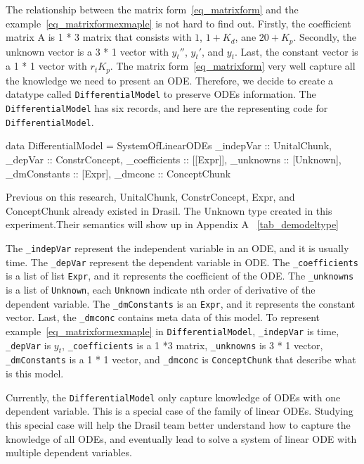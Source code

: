 The relationship between the matrix form~\ref{eq_matrixform} and the example~\ref{eq_matrixformexmaple} is not hard to find out. Firstly, the coefficient matrix A is 1 * 3 matrix that consists with $1$, $1 + K_d$, ane $20 + K_p$. Secondly, the unknown vector is a 3 * 1 vector with $y_t''$, $y_t'$, and $y_t$. Last, the constant vector is a 1 * 1 vector with $r_t K_p$. The matrix form~\ref{eq_matrixform} very well capture all the knowledge we need to present an ODE. Therefore, we decide to create a datatype called \verb|DifferentialModel| to preserve ODEs information. The \verb|DifferentialModel| has six records, and here are the representing code for \verb|DifferentialModel|.
\begin{haskell1}
data DifferentialModel = SystemOfLinearODEs {
	_indepVar :: UnitalChunk,
	_depVar :: ConstrConcept,
	_coefficients :: [[Expr]],
	_unknowns :: [Unknown],
	_dmConstants :: [Expr],
	_dmconc :: ConceptChunk
}
\end{haskell1}

Previous on this research, UnitalChunk, ConstrConcept, Expr, and ConceptChunk already existed in Drasil. The Unknown type created in this experiment.Their semantics will show up in Appendix A ~\ref{tab_demodeltype}

The \verb|_indepVar| represent the independent variable in an ODE, and it is usually time. The \verb|_depVar| represent the dependent variable in ODE. The \verb|_coefficients| is a list of list \verb|Expr|, and it represents the coefficient of the ODE. The \verb|_unknowns| is a list of \verb|Unknown|, each \verb|Unknown| indicate nth order of derivative of the dependent variable. The \verb|_dmConstants| is an \verb|Expr|, and it represents the constant vector. Last, the \verb|_dmconc| contains meta data of this model. To represent example~\ref{eq_matrixformexmaple} in \verb|DifferentialModel|, \verb|_indepVar| is time, \verb|_depVar| is $y_t$, \verb|_coefficients| is a 1 *3 matrix, \verb|_unknowns| is 3 * 1 vector, \verb|_dmConstants| is a 1 * 1 vector, and \verb|_dmconc| is \verb|ConceptChunk| that describe what is this model.

Currently, the \verb|DifferentialModel| only capture knowledge of ODEs with one dependent variable. This is a special case of the family of linear ODEs. Studying this special case will help the Drasil team better understand how to capture the knowledge of all ODEs, and eventually lead to solve a system of linear ODE with multiple dependent variables.

